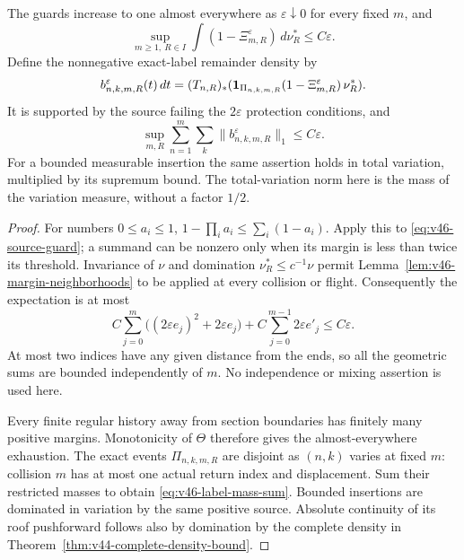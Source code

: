 \begin{proposition}
\label{prop:v46-protection-mass}
The guards increase to one almost everywhere as
$\varepsilon\downarrow0$ for every fixed $m$, and
\begin{equation}\label{eq:v46-unprotected-mass}
 \sup_{m\ge1,\ R\in I}
       \int(1-\Xi_{m,R}^{\varepsilon})\,d\nu_R^*
                                  \le C\varepsilon.
\end{equation}
Define the nonnegative exact-label remainder density by
\begin{equation}\label{eq:v46-boundary-density}
 b^{\varepsilon}_{n,k,m,R}(t)\,dt
  =(T_{n,R})_*(\one_{\Pi_{n,k,m,R}}
                       (1-\Xi_{m,R}^{\varepsilon})\,\nu_R^*).
\end{equation}
It is supported by the source failing the $2\varepsilon$ protection
conditions, and
\begin{equation}\label{eq:v46-label-mass-sum}
 \sup_{m,R}\sum_{n=1}^m\sum_k\|b^{\varepsilon}_{n,k,m,R}\|_1
                                  \le C\varepsilon.
\end{equation}
For a bounded measurable insertion the same assertion holds in total
variation, multiplied by its supremum bound. The total-variation norm
here is the mass of the variation measure, without a factor $1/2$.
\end{proposition}
\begin{proof}
For numbers $0\le a_i\le1$, $1-\prod_i a_i\le\sum_i(1-a_i)$.
Apply this to \eqref{eq:v46-source-guard}; a summand can be nonzero
only when its margin is less than twice its threshold. Invariance of
$\nu$ and domination $\nu_R^*\le c^{-1}\nu$ permit
Lemma~\ref{lem:v46-margin-neighborhoods} to be applied at every
collision or flight. Consequently the expectation is at most
\[
 C\sum_{j=0}^{m}\bigl((2\varepsilon e_j)^2+2\varepsilon e_j\bigr)
     +C\sum_{j=0}^{m-1}2\varepsilon e'_j
                           \le C\varepsilon.
\]
At most two indices have any given distance from the ends, so all the
geometric sums are bounded independently of $m$. No independence or
mixing assertion is used here.

Every finite regular history away from section boundaries has finitely
many positive margins. Monotonicity of $\Theta$ therefore gives the
almost-everywhere exhaustion. The exact events $\Pi_{n,k,m,R}$ are
disjoint as $(n,k)$ varies at fixed $m$: collision $m$ has at most one
actual return index and displacement. Sum their restricted masses to
obtain \eqref{eq:v46-label-mass-sum}. Bounded insertions are dominated
in variation by the same positive source. Absolute continuity of its
roof pushforward follows also by domination by the complete density
in Theorem~\ref{thm:v44-complete-density-bound}.
\end{proof}

